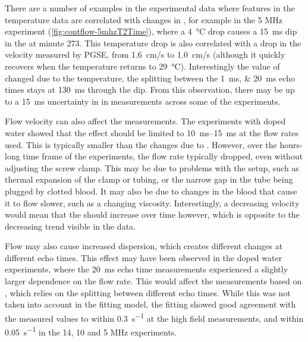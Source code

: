 There are a number of examples in the experimental data where features in the temperature data are correlated with changes in \Ttwo, for example in the 5 MHz experiment (\autoref{fig:contflow-5mhzT2Time}), where a \SI{4}{\celsius} drop causes a \SI{15}{ms} dip in the \Ttwo at minute 273.
This temperature drop is also correlated with a drop in the velocity measured by PGSE, from \SI{1.6}{cm/s} to \SI{1.0}{cm/s} (although it quickly recovers when the temperature returns to \SI{29}{\celsius}).
Interestingly the value of \Ttwo changed due to the temperature, the splitting between the \SIlist{1;20}{ms} echo times stays at \SI{130}{ms} through the dip.
From this observation, there may be up to a \SI{15}{ms} uncertainty in in \Ttwo measurements across some of the experiments.

Flow velocity can also affect the \Ttwo measurements.
The experiments with doped water showed that the effect should be limited to \SIrange{10}{15}{ms} at the flow rates used.
This is typically smaller than the changes due to \SOtwo.
However, over the hours-long time frame of the experiments, the flow rate typically dropped, even without adjusting the screw clamp.
This may be due to problems with the setup, such as thermal expansion of the clamp or tubing, or the narrow gap in the tube being plugged by clotted blood.
It may also be due to changes in the blood that cause it to flow slower, such as a changing viscosity.
Interestingly, a decreasing velocity would mean that the \Ttwo should increase over time however, which is opposite to the decreasing trend visible in the data.

Flow may also cause increased dispersion, which creates different \Ttwo changes at different echo times.
This effect may have been observed in the doped water experiments, where the \SI{20}{ms} echo time \Ttwo measurements experienced a slightly larger dependence on the flow rate.
This would affect the measurements based on \Kzero, which relies on the splitting between different echo times.
While this was not taken into account in the fitting model, the \Kzero fitting showed good agreement with the measured \Rtwo values to within \SI{0.3}{s^{-1}} at the high field measurements, and within \SI{0.05}{s^{-1}} in the 14, 10 and 5 MHz experiments.

